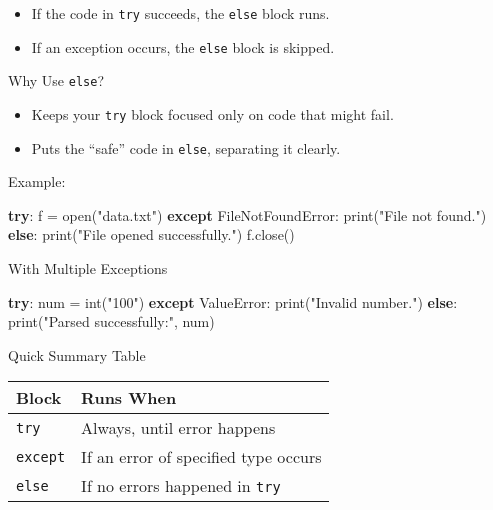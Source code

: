 \documentclass[
  letterpaper,
  DIV=11,
  numbers=noendperiod]{scrreprt}
\newenvironment{Shaded}{\begin{snugshade}}{\end{snugshade}}
\newcommand{\BuiltInTok}[1]{\textcolor[rgb]{0.00,0.23,0.31}{#1}}
\newcommand{\ControlFlowTok}[1]{\textcolor[rgb]{0.00,0.23,0.31}{\textbf{#1}}}
\newcommand{\NormalTok}[1]{\textcolor[rgb]{0.00,0.23,0.31}{#1}}
\newcommand{\OperatorTok}[1]{\textcolor[rgb]{0.37,0.37,0.37}{#1}}
\newcommand{\PreprocessorTok}[1]{\textcolor[rgb]{0.68,0.00,0.00}{#1}}
\newcommand{\StringTok}[1]{\textcolor[rgb]{0.13,0.47,0.30}{#1}}
\providecommand{\tightlist}{%
  \setlength{\itemsep}{0pt}\setlength{\parskip}{0pt}}
\begin{document}
\begin{itemize}
\tightlist
\item
  If the code in \texttt{try} succeeds, the \texttt{else} block runs.
\item
  If an exception occurs, the \texttt{else} block is skipped.
\end{itemize}

Why Use \texttt{else}?

\begin{itemize}
\tightlist
\item
  Keeps your \texttt{try} block focused only on code that might fail.
\item
  Puts the ``safe'' code in \texttt{else}, separating it clearly.
\end{itemize}

Example:

\begin{Shaded}
\begin{Highlighting}[]
\ControlFlowTok{try}\NormalTok{:}
\NormalTok{    f }\OperatorTok{=} \BuiltInTok{open}\NormalTok{(}\StringTok{"data.txt"}\NormalTok{)}
\ControlFlowTok{except} \PreprocessorTok{FileNotFoundError}\NormalTok{:}
    \BuiltInTok{print}\NormalTok{(}\StringTok{"File not found."}\NormalTok{)}
\ControlFlowTok{else}\NormalTok{:}
    \BuiltInTok{print}\NormalTok{(}\StringTok{"File opened successfully."}\NormalTok{)}
\NormalTok{    f.close()}
\end{Highlighting}
\end{Shaded}

With Multiple Exceptions

\begin{Shaded}
\begin{Highlighting}[]
\ControlFlowTok{try}\NormalTok{:}
\NormalTok{    num }\OperatorTok{=} \BuiltInTok{int}\NormalTok{(}\StringTok{"100"}\NormalTok{)}
\ControlFlowTok{except} \PreprocessorTok{ValueError}\NormalTok{:}
    \BuiltInTok{print}\NormalTok{(}\StringTok{"Invalid number."}\NormalTok{)}
\ControlFlowTok{else}\NormalTok{:}
    \BuiltInTok{print}\NormalTok{(}\StringTok{"Parsed successfully:"}\NormalTok{, num)}
\end{Highlighting}
\end{Shaded}

Quick Summary Table

\begin{longtable}[]{@{}ll@{}}
\toprule\noalign{}
Block & Runs When \\
\midrule\noalign{}
\endhead
\bottomrule\noalign{}
\endlastfoot
\texttt{try} & Always, until error happens \\
\texttt{except} & If an error of specified type occurs \\
\texttt{else} & If no errors happened in \texttt{try} \\
\end{longtable}
\end{document}

